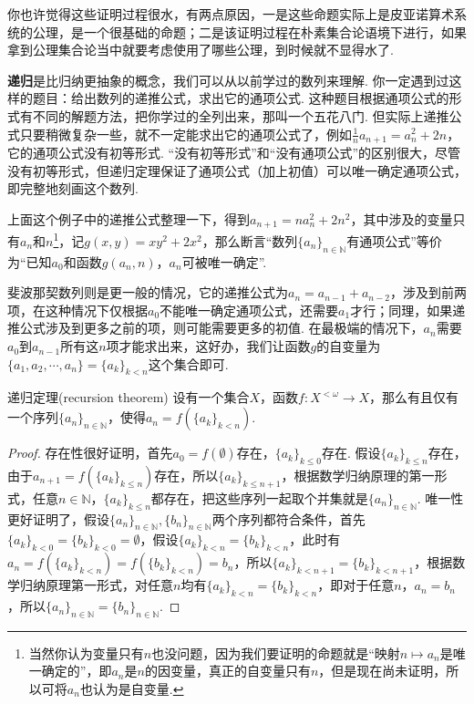 \documentclass[main.tex]{subfiles}
\begin{document}
你也许觉得这些证明过程很水，有两点原因，一是这些命题实际上是皮亚诺算术系统的公理，是一个很基础的命题；二是该证明过程在朴素集合论语境下进行，如果拿到公理集合论当中就要考虑使用了哪些公理，到时候就不显得水了. 

\textbf{递归}是比归纳更抽象的概念，我们可以从以前学过的数列来理解. 你一定遇到过这样的题目：给出数列的递推公式，求出它的通项公式. 这种题目根据通项公式的形式有不同的解题方法，把你学过的全列出来，那叫一个五花八门. 但实际上递推公式只要稍微复杂一些，就不一定能求出它的通项公式了，例如\(\frac{1}{n}a_{n+1}=a_n^2+2n\)，它的通项公式没有初等形式. “没有初等形式”和“没有通项公式”的区别很大，尽管没有初等形式，但递归定理保证了通项公式（加上初值）可以唯一确定通项公式，即完整地刻画这个数列.

上面这个例子中的递推公式整理一下，得到\(a_{n+1}=na_n^2+2n^2\)，其中涉及的变量只有\(a_n\)和\(n\)\footnote{当然你认为变量只有\(n\)也没问题，因为我们要证明的命题就是“映射\(n \mapsto a_n\)是唯一确定的”，即\(a_n\)是\(n\)的因变量，真正的自变量只有\(n\)，但是现在尚未证明，所以可将\(a_n\)也认为是自变量.}，记\(g(x,y)=xy^2+2x^2\)，那么断言“数列\(\{a_n\}_{n \in \mathbb{N}}\)有通项公式”等价为“已知\(a_0\)和函数\(g(a_n,n)\)，\(a_n\)可被唯一确定”.

斐波那契数列则是更一般的情况，它的递推公式为\(a_n=a_{n-1}+a_{n-2}\)，涉及到前两项，在这种情况下仅根据\(a_0\)不能唯一确定通项公式，还需要\(a_1\)才行；同理，如果递推公式涉及到更多之前的项，则可能需要更多的初值. 在最极端的情况下，\(a_n\)需要\(a_0\)到\(a_{n-1}\)所有这\(n\)项才能求出来，这好办，我们让函数\(g\)的自变量为\(\{a_1,a_2,\cdots,a_n\}=\{a_k\}_{k<n}\)这个集合即可.

\begin{theorem}{递归定理(recursion theorem)}
    设有一个集合\(X\)，函数\(f: X^{<\omega} \to X\)，那么有且仅有一个序列\(\{a_n\}_{n \in \mathbb{N}}\)，使得\(a_n = f(\{a_k\}_{k < n})\).
\end{theorem}

\begin{proof}
    存在性很好证明，首先\(a_0 = f(\emptyset)\)存在，\(\{a_k\}_{k \leq 0}\)存在. 假设\(\{a_k\}_{k \leq n}\)存在，由于\(a_{n+1} = f(\{a_k\}_{k \leq n})\)存在，所以\(\{a_k\}_{k \leq n+1}\)，根据数学归纳原理的第一形式，任意\(n \in \mathbb{N}\)，\(\{a_k\}_{k \leq n}\)都存在，把这些序列一起取个并集就是\(\{a_n\}_{n \in \mathbb{N}}\). \newline
    唯一性更好证明了，假设\(\{a_n\}_{n \in \mathbb{N}}, \{b_n\}_{n \in \mathbb{N}}\)两个序列都符合条件，首先\(\{a_k\}_{k < 0} = \{b_k\}_{k < 0} = \emptyset\)，假设\(\{a_k\}_{k < n} = \{b_k\}_{k < n}\)，此时有\(a_n = f(\{a_k\}_{k < n}) = f(\{b_k\}_{k < n}) = b_n\)，所以\(\{a_k\}_{k < n+1} = \{b_k\}_{k < n+1}\)，根据数学归纳原理第一形式，对任意\(n\)均有\(\{a_k\}_{k < n} = \{b_k\}_{k < n}\)，即对于任意\(n\)，\(a_n = b_n\)，所以\(\{a_n\}_{n \in \mathbb{N}} = \{b_n\}_{n \in \mathbb{N}}\).
\end{proof}
\end{document}
